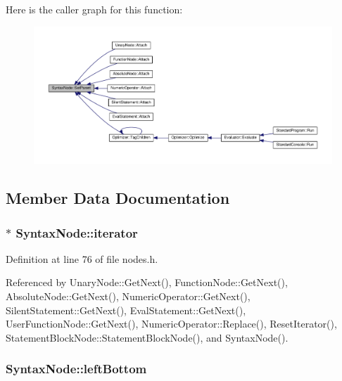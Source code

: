 Here is the caller graph for this function\+:
\nopagebreak
\begin{figure}[H]
\begin{center}
\leavevmode
\includegraphics[width=350pt]{d8/d5d/classSyntaxNode_a7902bb2c389a784c11c2b649a84824e9_icgraph}
\end{center}
\end{figure}




\subsection{Member Data Documentation}
\subsubsection[{\texorpdfstring{iterator}{iterator}}]{$\ast$ Syntax\+Node\+::iterator\hspace{0.3cm}{\ttfamily [protected]}}\hypertarget{classSyntaxNode_a9bd3349d05f33eaa271cca1805a86e1b}{}\label{classSyntaxNode_a9bd3349d05f33eaa271cca1805a86e1b}


Definition at line 76 of file nodes.\+h.



Referenced by Unary\+Node\+::\+Get\+Next(), Function\+Node\+::\+Get\+Next(), Absolute\+Node\+::\+Get\+Next(), Numeric\+Operator\+::\+Get\+Next(), Silent\+Statement\+::\+Get\+Next(), Eval\+Statement\+::\+Get\+Next(), User\+Function\+Node\+::\+Get\+Next(), Numeric\+Operator\+::\+Replace(), Reset\+Iterator(), Statement\+Block\+Node\+::\+Statement\+Block\+Node(), and Syntax\+Node().

\subsubsection[{\texorpdfstring{left\+Bottom}{leftBottom}}]{ Syntax\+Node\+::left\+Bottom\hspace{0.3cm}{\ttfamily [protected]}}\hypertarget{classSyntaxNode_ae0488f07ad7cc43143e44e89ec27bc40}{}\label{classSyntaxNode_ae0488f07ad7cc43143e44e89ec27bc40}


